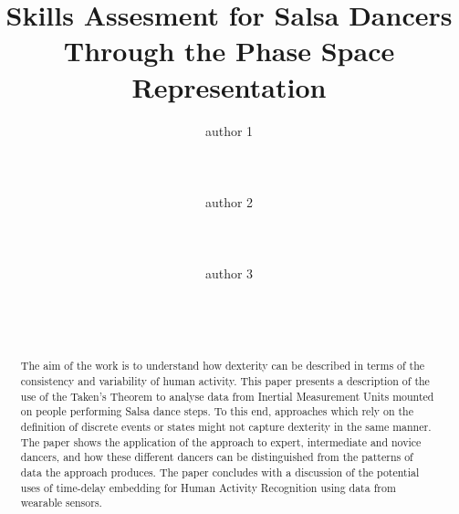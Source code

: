 \documentclass{sigchi}
\begin{document}
\title{Skills Assesment for Salsa Dancers \\
Through the Phase Space Representation}

\author{
  \alignauthor author 1\\
    \\
    \\
    \\
  \alignauthor author 2\\ %
    \\
    \\
    \\
  \alignauthor author 3\\ %
    \\
    \\
    \\
}

\maketitle

\begin{abstract}
The aim of the work is to understand how dexterity can be described in terms of the consistency 
and variability of human activity. 
This paper presents a description of the use of the Taken's Theorem 
to analyse data from Inertial Measurement Units mounted on people performing Salsa dance steps.  
To this end, approaches which rely on the definition of 
discrete events or states might not capture dexterity in the same manner. 
The paper shows the application of the approach to expert, intermediate and novice dancers, 
and how these different dancers can be distinguished from the patterns of data the approach produces. 
The paper concludes with a discussion of the potential uses of time-delay embedding for 
Human Activity Recognition using data from wearable sensors.


\end{abstract}



\end{document}
